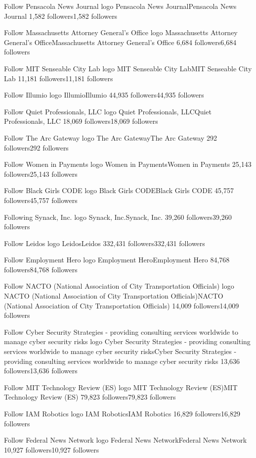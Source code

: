 Follow
Pensacola News Journal logo
Pensacola News JournalPensacola News Journal
1,582 followers1,582 followers

Follow
Massachusetts Attorney General's Office logo
Massachusetts Attorney General's OfficeMassachusetts Attorney General's Office
6,684 followers6,684 followers

Follow
MIT Senseable City Lab logo
MIT Senseable City LabMIT Senseable City Lab
11,181 followers11,181 followers

Follow
Illumio logo
IllumioIllumio
44,935 followers44,935 followers

Follow
Quiet Professionals, LLC logo
Quiet Professionals, LLCQuiet Professionals, LLC
18,069 followers18,069 followers

Follow
The Arc Gateway logo
The Arc GatewayThe Arc Gateway
292 followers292 followers

Follow
Women in Payments logo
Women in PaymentsWomen in Payments
25,143 followers25,143 followers

Follow
Black Girls CODE logo
Black Girls CODEBlack Girls CODE
45,757 followers45,757 followers

Following
Synack, Inc. logo
Synack, Inc.Synack, Inc.
39,260 followers39,260 followers

Follow
Leidos logo
LeidosLeidos
332,431 followers332,431 followers

Follow
Employment Hero logo
Employment HeroEmployment Hero
84,768 followers84,768 followers

Follow
NACTO (National Association of City Transportation Officials) logo
NACTO (National Association of City Transportation Officials)NACTO (National Association of City Transportation Officials)
14,009 followers14,009 followers

Follow
Cyber Security Strategies - providing consulting services worldwide to manage cyber security risks logo
Cyber Security Strategies - providing consulting services worldwide to manage cyber security risksCyber Security Strategies - providing consulting services worldwide to manage cyber security risks
13,636 followers13,636 followers

Follow
MIT Technology Review (ES) logo
MIT Technology Review (ES)MIT Technology Review (ES)
79,823 followers79,823 followers

Follow
IAM Robotics logo
IAM RoboticsIAM Robotics
16,829 followers16,829 followers

Follow
Federal News Network logo
Federal News NetworkFederal News Network
10,927 followers10,927 followers

